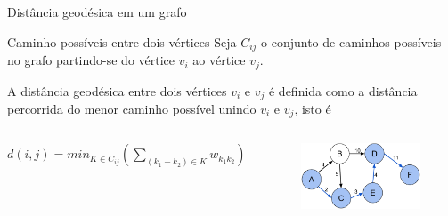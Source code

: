 \documentclass[11pt]{beamer}
\begin{document}
\begin{frame}{Distância geodésica em um grafo}

\begin{block}{Caminho possíveis entre dois vértices}
Seja $C_{ij}$ o conjunto de caminhos possíveis no grafo partindo-se do vértice $v_i$ ao vértice $v_j$.
\end{block}

\vspace{0.5cm}

A distância geodésica entre dois vértices $v_i$ e $v_j$ é definida como a distância percorrida do menor caminho possível unindo $v_i$ e $v_j$, isto é

\begin{columns}


$ d(i, j) = min_{ K \in C_{ij} } \left (\sum_{(k_1 - k_2) \in K} w_{k_1k_2} \right )$


\vspace{0.5cm}

\begin{figure}
\includegraphics[scale=0.07]{geodesic}
\end{figure}


\vspace{.5cm}
\end{columns}


\end{frame}
\end{document}
